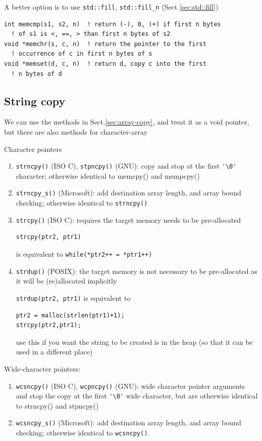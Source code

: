 A better option is to use \verb!std::fill!, \verb!std::fill_n!
(Sect.\ref{sec:std::fill})

\begin{lstlisting}
int memcmp(s1, s2, n)  ! return (-), 0, (+) if first n bytes
  ! of s1 is <, ==, > than first n bytes of s2
void *memchr(s, c, n)  ! return the pointer to the first
  ! occurrence of c in first n bytes of s
void *memset(d, c, n)  ! return d, copy c into the first
  ! n bytes of d
\end{lstlisting}


\subsection{String copy}
\label{sec:string-copy}

We can use the methods in Sect.\ref{sec:array-copy}, and treat it as a void
pointer, but there are also methods for character-array

Character pointers
\begin{enumerate}

  \item \verb!strncpy()! (ISO C), \verb!stpncpy()! (GNU): copy and stop at the
  first \verb!'\0'! character; otherwise identical to memcpy() and mempcpy()
  
  \item \verb!strncpy_s()! (Microsoft): add destination array
  length, and array bound checking; otherwise identical to \verb!strncpy()!
  
  \item \verb!strcpy()! (ISO C): requires the target memory needs to be
  pre-allocated
  
\begin{lstlisting}
strcpy(ptr2, ptr1) 
\end{lstlisting}  
is equivalent to \verb!while(*ptr2++ = *ptr1++)!

  \item \verb!strdup()! (POSIX): the target memory is not necessary to be
  pre-allocated as it will be (re)allocated implicitly
  
\verb!strdup(ptr2, ptr1)! is equivalent to  
\begin{lstlisting}
ptr2 = malloc(strlen(ptr1)+1);
strcpy(ptr2,ptr1);
\end{lstlisting}  
use this if you want the string to be created is in the heap (so that it can be
used in a different place)


\end{enumerate}

Wide-character pointers:
\begin{enumerate}
  \item \verb!wcsncpy()! (ISO C), \verb!wcpncpy()! (GNU): wide character pointer arguments
  and stop the copy at the first \verb!'\0'! wide character, but are otherwise
  identical to strncpy() and stpncpy()
  
  \item \verb!wcsncpy_s()! (Microsoft): add destination
  array length, and array bound checking; otherwise identical to
  \verb!wcsncpy()!.
  
\end{enumerate}